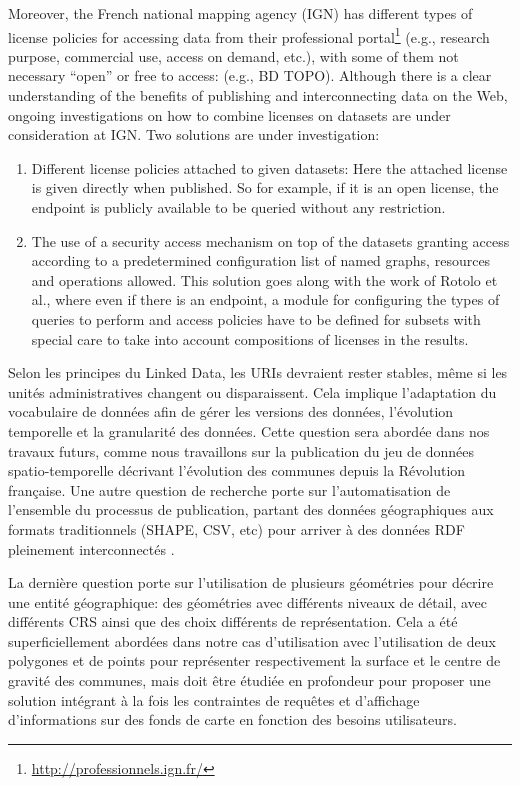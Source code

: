 \documentclass[a4paper,11pt,twoside]{report}
\begin{document}
Moreover, the French national mapping agency (IGN) has different types of license policies for accessing data from their professional portal\footnote{\url{http://professionnels.ign.fr/}}  (e.g., research purpose, commercial use, access on demand, etc.), with some of them not necessary ``open'' or free to access: (e.g., BD TOPO\circledR). Although there is a clear understanding of the benefits of publishing and interconnecting data on the Web, ongoing investigations on how to combine licenses on datasets are under consideration at IGN. Two solutions are under investigation: 
\begin{enumerate}
\item Different license policies attached to given datasets: Here the attached license is given directly when published. So for example, if it is an open license, the endpoint is publicly available to be queried without any restriction.

\item The use of a security access mechanism on top of the datasets granting access according to a predetermined configuration list of named graphs, resources and operations allowed. This solution goes along with the work of Rotolo et al.\cite{rotolo2013deontic}, where even if there is an endpoint, a module for configuring the types of queries to perform and access policies have to be defined for subsets with special care to take into account compositions of licenses in the results.
\end{enumerate}



Selon les principes du Linked Data, les URIs devraient rester stables, même si les unités administratives changent ou disparaissent. Cela implique l'adaptation du vocabulaire de données afin de gérer les versions des données, l'évolution temporelle et la granularité des données. Cette question sera abordée dans nos travaux futurs, comme nous travaillons sur la publication du jeu de données spatio-temporelle décrivant l'évolution des communes depuis la Révolution française. Une autre question de recherche porte sur l'automatisation de l'ensemble du processus de publication, partant des données géographiques aux formats traditionnels (SHAPE, CSV, etc) pour arriver à des données RDF pleinement interconnectés .

La dernière question porte sur l'utilisation de plusieurs géométries pour décrire une entité géographique: des géométries avec différents niveaux de détail, avec différents CRS ainsi que des choix différents de représentation. Cela a été superficiellement abordées dans notre cas d'utilisation avec l'utilisation de deux polygones et de points pour représenter respectivement la surface et le centre de gravité des communes, mais doit être étudiée en profondeur pour proposer une solution intégrant à la fois les contraintes de requêtes et d'affichage d'informations sur des fonds de carte en fonction des besoins utilisateurs.
\end{document}
